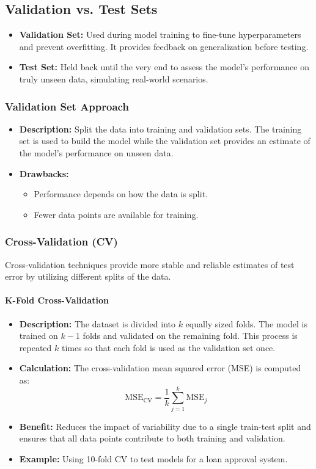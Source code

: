 \documentclass[11pt]{article}
\begin{document}
\subsection{Validation vs. Test Sets}
\begin{itemize}
    \item \textbf{Validation Set:} Used during model training to fine-tune hyperparameters and prevent overfitting. It provides feedback on generalization before testing.
    \item \textbf{Test Set:} Held back until the very end to assess the model's performance on truly unseen data, simulating real-world scenarios.
\end{itemize}

\subsubsection{Validation Set Approach}
\begin{itemize}
    \item \textbf{Description:} Split the data into training and validation sets. The training set is used to build the model while the validation set provides an estimate of the model’s performance on unseen data.
    \item \textbf{Drawbacks:} 
    \begin{itemize}
        \item Performance depends on how the data is split.
        \item Fewer data points are available for training.
    \end{itemize}
\end{itemize}

\subsubsection{Cross-Validation (CV)}
Cross-validation techniques provide more stable and reliable estimates of test error by utilizing different splits of the data.

\paragraph{K-Fold Cross-Validation}
\begin{itemize}
    \item \textbf{Description:} The dataset is divided into $k$ equally sized folds. The model is trained on $k-1$ folds and validated on the remaining fold. This process is repeated $k$ times so that each fold is used as the validation set once.
    \item \textbf{Calculation:} The cross-validation mean squared error (MSE) is computed as:
    \[
    \text{MSE}_{\text{CV}} = \frac{1}{k} \sum_{j=1}^k \text{MSE}_j
    \]
    \item \textbf{Benefit:} Reduces the impact of variability due to a single train-test split and ensures that all data points contribute to both training and validation.
    \item \textbf{Example:} Using 10-fold CV to test models for a loan approval system.
\end{itemize}
\end{document}
